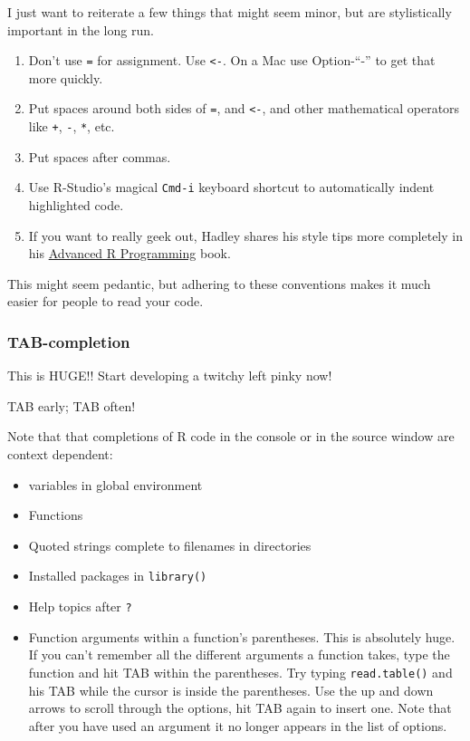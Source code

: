 \documentclass[]{book}
\providecommand{\tightlist}{%
  \setlength{\itemsep}{0pt}\setlength{\parskip}{0pt}}
\theoremstyle{definition}
\theoremstyle{definition}
\theoremstyle{remark}
\begin{document}
I just want to reiterate a few things that might seem minor, but are
stylistically important in the long run.

\begin{enumerate}
\def\labelenumi{\arabic{enumi}.}
\tightlist
\item
  Don't use \texttt{=} for assignment. Use \texttt{\textless{}-}. On a
  Mac use Option-``-'' to get that more quickly.
\item
  Put spaces around both sides of \texttt{=}, and \texttt{\textless{}-},
  and other mathematical operators like \texttt{+}, \texttt{-},
  \texttt{*}, etc.
\item
  Put spaces after commas.
\item
  Use R-Studio's magical \texttt{Cmd-i} keyboard shortcut to
  automatically indent highlighted code.
\item
  If you want to really geek out, Hadley shares his style tips more
  completely in his \href{http://adv-r.had.co.nz/Style.html}{Advanced R
  Programming} book.
\end{enumerate}

This might seem pedantic, but adhering to these conventions makes it
much easier for people to read your code.

\subsubsection{TAB-completion}\label{tab-completion}

This is HUGE!! Start developing a twitchy left pinky now!

TAB early; TAB often!

Note that that completions of R code in the console or in the source
window are context dependent:

\begin{itemize}
\tightlist
\item
  variables in global environment
\item
  Functions
\item
  Quoted strings complete to filenames in directories
\item
  Installed packages in \texttt{library()}
\item
  Help topics after \texttt{?}
\item
  Function arguments within a function's parentheses. This is absolutely
  huge. If you can't remember all the different arguments a function
  takes, type the function and hit TAB within the parentheses. Try
  typing \texttt{read.table()} and his TAB while the cursor is inside
  the parentheses. Use the up and down arrows to scroll through the
  options, hit TAB again to insert one. Note that after you have used an
  argument it no longer appears in the list of options.
\end{itemize}
\end{document}
